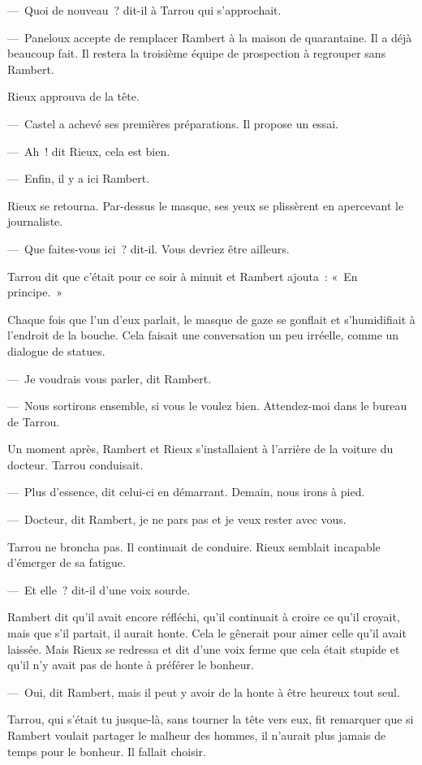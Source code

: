 \documentclass[french,twoside]{book} %
\begin{document}
— Quoi de nouveau ? dit-il à Tarrou qui s’approchait.\par
— Paneloux accepte de remplacer Rambert à la maison de quarantaine. Il a déjà beaucoup fait. Il restera la troisième équipe de prospection à regrouper sans Rambert.\par
Rieux approuva de la tête.\par
— Castel a achevé ses premières préparations. Il propose un essai.\par
— Ah ! dit Rieux, cela est bien.\par
— Enfin, il y a ici Rambert.\par
Rieux se retourna. Par-dessus le masque, ses yeux se plissèrent en apercevant le journaliste.\par
— Que faites-vous ici ? dit-il. Vous devriez être ailleurs.\par
Tarrou dit que c’était pour ce soir à minuit et Rambert ajouta : « En principe. »\par
Chaque fois que l’un d’eux parlait, le masque de gaze se gonflait et s’humidifiait à l’endroit de la bouche. Cela faisait une conversation un peu irréelle, comme un dialogue de statues.\par
— Je voudrais vous parler, dit Rambert.\par
— Nous sortirons ensemble, si vous le voulez bien. Attendez-moi dans le bureau de Tarrou.\par
Un moment après, Rambert et Rieux s’installaient à l’arrière de la voiture du docteur. Tarrou conduisait.\par
— Plus d’essence, dit celui-ci en démarrant. Demain, nous irons à pied.\par
— Docteur, dit Rambert, je ne pars pas et je veux rester avec vous.\par
Tarrou ne broncha pas. Il continuait de conduire. Rieux semblait incapable d’émerger de sa fatigue.\par
— Et elle ? dit-il d’une voix sourde.\par
Rambert dit qu’il avait encore réfléchi, qu’il continuait à croire ce qu’il croyait, mais que s’il partait, il aurait honte. Cela le gênerait pour aimer celle qu’il avait laissée. Mais Rieux se redressa et dit d’une voix ferme que cela était stupide et qu’il n’y avait pas de honte à préférer le bonheur.\par
— Oui, dit Rambert, mais il peut y avoir de la honte à être heureux tout seul.\par
Tarrou, qui s’était tu jusque-là, sans tourner la tête vers eux, fit remarquer que si Rambert voulait partager le malheur des hommes, il n’aurait plus jamais de temps pour le bonheur. Il fallait choisir.\par
\end{document}
